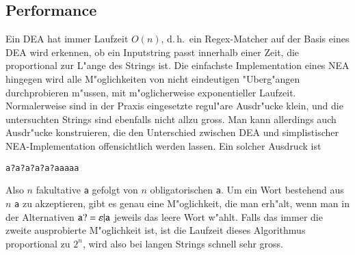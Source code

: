 \subsection{Performance}
Ein DEA hat immer Laufzeit $O(n)$, d.\,h.~ein Regex-Matcher auf der
Basis eines DEA wird erkennen, ob ein Inputstring passt innerhalb 
einer Zeit, die proportional zur L"ange des Strings ist.
Die einfachste Implementation eines NEA hingegen wird alle M"oglichkeiten
von nicht eindeutigen "Uberg"angen durchprobieren m"ussen, mit
m"oglicherweise exponentieller Laufzeit. Normalerweise sind in der
Praxis eingesetzte regul"are Ausdr"ucke klein, und die untersuchten
Strings sind ebenfalls nicht allzu gross. Man kann allerdings auch
Ausdr"ucke konstruieren, die den Unterschied zwischen DEA und simplistischer
NEA-Implementation offensichtlich werden lassen. Ein solcher Ausdruck
ist
\begin{center}
\tt a?a?a?a?a?aaaaa
\end{center}
Also $n$ fakultative {\tt a} gefolgt von $n$ obligatorischen {\tt a}.
Um ein Wort bestehend aus $n$ {\tt a} zu akzeptieren, gibt es genau eine
M"oglichkeit, die man erh"alt, wenn man in der Alternativen
${\tt a?} = \varepsilon|{\tt a}$
jeweils das leere Wort w"ahlt. Falls das immer die zweite ausprobierte 
M"oglichkeit ist, ist die Laufzeit dieses Algorithmus proportional zu
$2^n$, wird also bei langen Strings schnell sehr gross.


